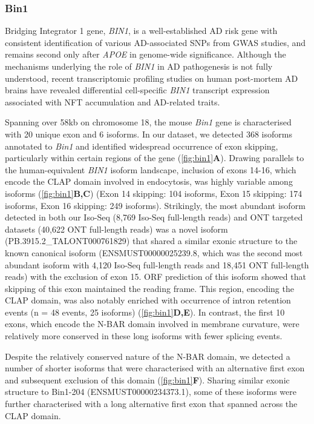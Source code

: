 \newpage
\subsubsection{Bin1}
\label{ch5: bin1_annotation}
Bridging Integrator 1 gene, \textit{BIN1}, is a well-established AD risk gene with consistent identification of various AD-associated SNPs from GWAS studies, and remains second only after \textit{APOE} in genome-wide significance\cite{Kunkle2019}. Although the mechanisms underlying the role of \textit{BIN1} in AD pathogenesis is not fully understood, recent transcriptomic profiling studies on human post-mortem AD brains have revealed differential cell-specific \textit{BIN1} transcript expression associated with NFT accumulation and AD-related traits\cite{Taga2020}. 

Spanning over 58kb on chromosome 18, the mouse \textit{Bin1} gene is characterised with 20 unique exon and 6 isoforms. In our dataset, we detected 368 isoforms annotated to \textit{Bin1} and identified widespread occurrence of exon skipping, particularly within certain regions of the gene (\cref{fig:bin1}\textbf{A}). Drawing parallels to the human-equivalent \textit{BIN1} isoform landscape\cite{Taga2020}, inclusion of exons 14-16, which encode the CLAP domain involved in endocytosis, was highly variable among isoforms (\cref{fig:bin1}\textbf{B,C}) (Exon 14 skipping: 104 isoforms, Exon 15 skipping: 174 isoforms, Exon 16 skipping: 249 isoforms). Strikingly, the most abundant isoform detected in both our Iso-Seq (8,769 Iso-Seq full-length reads) and ONT targeted datasets (40,622 ONT full-length reads) was a novel isoform (PB.3915.2\_TALONT000761829) that shared a similar exonic structure to the known canonical isoform (ENSMUST00000025239.8, which was the second most abundant isoform with 4,120 Iso-Seq full-length reads and 18,451 ONT full-length reads) with the exclusion of exon 15. ORF prediction of this isoform showed that skipping of this exon maintained the reading frame. This region, encoding the CLAP domain, was also notably enriched with occurrence of intron retention events (n = 48 events, 25 isoforms) (\cref{fig:bin1}\textbf{D,E}). In contrast, the first 10 exons, which encode the N-BAR domain involved in membrane curvature, were relatively more conserved in these long isoforms with fewer splicing events. 

Despite the relatively conserved nature of the N-BAR domain, we detected a number of shorter isoforms that were characterised with an alternative first exon and subsequent exclusion of this domain (\cref{fig:bin1}\textbf{F}). Sharing similar exonic structure to Bin1-204 (ENSMUST00000234373.1), some of these isoforms were further characterised with a long alternative first exon that spanned across the CLAP domain. 

